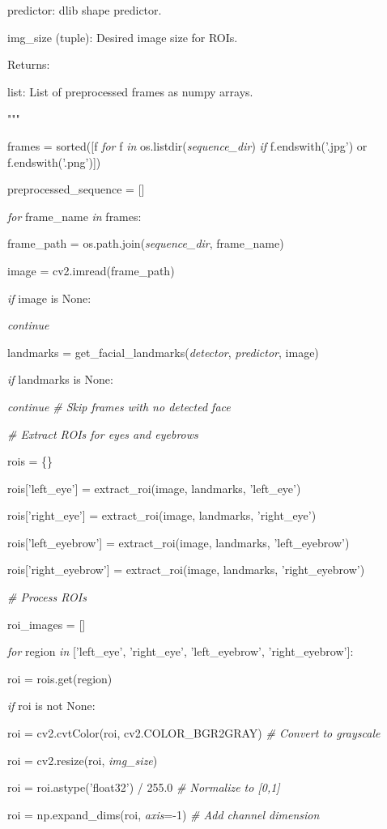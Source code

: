 \documentclass[
]{article}
\begin{document}
predictor: dlib shape predictor.

img\_size (tuple): Desired image size for ROIs.

Returns:

list: List of preprocessed frames as numpy arrays.

"""

frames = sorted({[}f \emph{for} f \emph{in} os.listdir(\emph{sequence\_dir}) \emph{if} f.endswith('.jpg') or f.endswith('.png'){]})

preprocessed\_sequence = {[}{]}

\emph{for} frame\_name \emph{in} frames:

frame\_path = os.path.join(\emph{sequence\_dir}, frame\_name)

image = cv2.imread(frame\_path)

\emph{if} image is None:

\emph{continue}

landmarks = get\_facial\_landmarks(\emph{detector}, \emph{predictor}, image)

\emph{if} landmarks is None:

\emph{continue} \emph{\# Skip frames with no detected face}

\emph{\# Extract ROIs for eyes and eyebrows}

rois = \{\}

rois{[}'left\_eye'{]} = extract\_roi(image, landmarks, 'left\_eye')

rois{[}'right\_eye'{]} = extract\_roi(image, landmarks, 'right\_eye')

rois{[}'left\_eyebrow'{]} = extract\_roi(image, landmarks, 'left\_eyebrow')

rois{[}'right\_eyebrow'{]} = extract\_roi(image, landmarks, 'right\_eyebrow')

\emph{\# Process ROIs}

roi\_images = {[}{]}

\emph{for} region \emph{in} {[}'left\_eye', 'right\_eye', 'left\_eyebrow', 'right\_eyebrow'{]}:

roi = rois.get(region)

\emph{if} roi is not None:

roi = cv2.cvtColor(roi, cv2.COLOR\_BGR2GRAY) \emph{\# Convert to grayscale}

roi = cv2.resize(roi, \emph{img\_size})

roi = roi.astype('float32') / 255.0 \emph{\# Normalize to {[}0,1{]}}

roi = np.expand\_dims(roi, \emph{axis}=-1) \emph{\# Add channel dimension}
\end{document}
